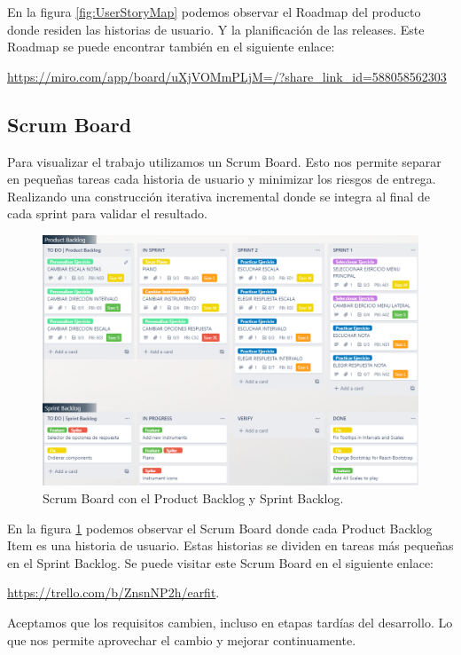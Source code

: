 \documentclass[12pt,twoside,titlepage]{report}
\begin{document}
En la figura \ref{fig:UserStoryMap} podemos observar el Roadmap del producto donde residen las historias de usuario. Y la planificación de las releases. Este Roadmap se puede encontrar también en el siguiente enlace: 

\url{https://miro.com/app/board/uXjVOMmPLjM=/?share_link_id=588058562303}

\subsection{Scrum Board}

Para visualizar el trabajo utilizamos un Scrum Board. Esto nos permite separar en pequeñas tareas cada historia de usuario y minimizar los riesgos de entrega. Realizando una construcción iterativa incremental donde se integra al final de cada sprint para validar el resultado. 

\begin{figure}[H]
    \centering
    \includegraphics[scale=0.47]{Scrum/ScrumBoard}
    \caption{Scrum Board con el Product Backlog y Sprint Backlog.}
    \label{fig:ScrumBoard}
\end{figure}

En la figura \ref{fig:ScrumBoard} podemos observar el Scrum Board donde cada Product Backlog Item es una historia de usuario. Estas historias se dividen en tareas más pequeñas en el Sprint Backlog. Se puede visitar este Scrum Board en el siguiente enlace: 

\url{https://trello.com/b/ZnsnNP2h/earfit}.

Aceptamos que los requisitos cambien, incluso en etapas tardías del desarrollo. Lo que nos permite aprovechar el cambio y mejorar continuamente.
\end{document}
